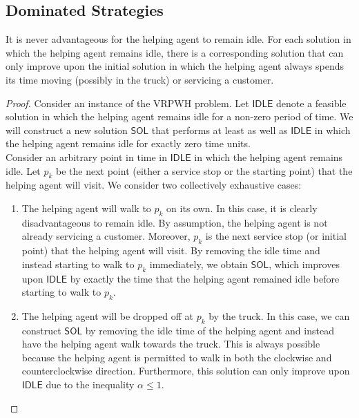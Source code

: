 \documentclass[12pt]{scrartcl}
\begin{document}
\subsection{Dominated Strategies}


\begin{proposition}
It is never advantageous for the helping agent to remain idle. For each solution in which the helping agent remains idle, there is a corresponding solution that can only improve upon the initial solution in which the helping agent always spends its time moving (possibly in the truck) or servicing a customer.
\end{proposition}
\begin{proof}
Consider an instance of the VRPWH problem. Let $\mathsf{IDLE}$ denote a feasible solution in which the helping agent remains idle for a non-zero period of time. We will construct a new solution $\mathsf{SOL}$ that performs at least as well as $\mathsf{IDLE}$ in which the helping agent remains idle for exactly zero time units. \\

Consider an arbitrary point in time in $\mathsf{IDLE}$ in which the helping agent remains idle. Let $p_k$ be the next point (either a service stop or the starting point) that the helping agent will visit. We consider two collectively exhaustive cases:

\begin{enumerate}
    \item The helping agent will walk to $p_k$ on its own. In this case, it is clearly disadvantageous to remain idle. By assumption, the helping agent is not already servicing a customer. Moreover, $p_k$ is the next service stop (or initial point) that the helping agent will visit. By removing the idle time and instead starting to walk to $p_k$ immediately, we obtain $\mathsf{SOL}$, which improves upon $\mathsf{IDLE}$ by exactly the time that the helping agent remained idle before starting to walk to $p_k.$  
    \item The helping agent will be dropped off at $p_k$ by the truck. In this case, we can construct $\mathsf{SOL}$ by removing the idle time of the helping agent and instead have the helping agent walk towards the truck. This is always possible because the helping agent is permitted to walk in both the clockwise and counterclockwise direction. Furthermore, this solution can only improve upon $\mathsf{IDLE}$ due to the inequality $\alpha \leq 1$.  
\end{enumerate}


\end{proof}
\end{document}

